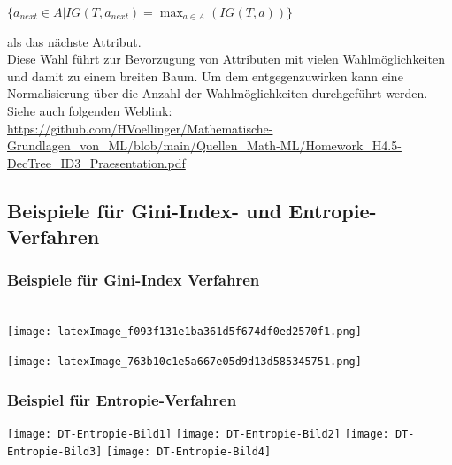 \documentclass[12pt]{article}
\begin{document}
\begin{center} 
$\lbrace a_{next} \in A | IG(T, a_{next}) = \max_{a \in A}(IG(T, a)) \rbrace $ 
\end{center}
als das nächste Attribut.\\[0.2cm]
Diese Wahl führt zur Bevorzugung von Attributen mit vielen Wahlmöglichkeiten und damit zu einem breiten Baum. Um dem entgegenzuwirken kann eine Normalisierung über die Anzahl der Wahlmöglichkeiten durchgeführt werden.\\
Siehe auch folgenden Weblink:\\
\url{https://github.com/HVoellinger/Mathematische-Grundlagen_von_ML/blob/main/Quellen_Math-ML/Homework_H4.5-DecTree_ID3_Praesentation.pdf}\\[0.2cm]


\subsection{Beispiele für Gini-Index- und Entropie-Verfahren }


\subsubsection{Beispiele für Gini-Index Verfahren}

{\color{red}{***********************************************************************\\ 
Ab hier bis Ende der Section sind die Folien der Vorlesung ML  zu nutzen und diese sind in Latex umzusetzen...\\
************************************************************************}}\\[0.2cm]



\hspace*{-1.8cm}
\texttt{[image: latexImage\_f093f131e1ba361d5f674df0ed2570f1.png]}

\hspace*{-1.8cm}
\texttt{[image: latexImage\_763b10c1e5a667e05d9d13d585345751.png]}

\subsubsection{Beispiel für Entropie-Verfahren}

\begin{center}
\hspace*{-3.0cm}   
\texttt{[image: DT-Entropie-Bild1]}
\hspace*{-2.5cm}   
\texttt{[image: DT-Entropie-Bild2]}
\hspace*{-2.5cm} 
\texttt{[image: DT-Entropie-Bild3]}
\hspace*{-2.5cm} 
\texttt{[image: DT-Entropie-Bild4]}
\end{center}
\end{document}
